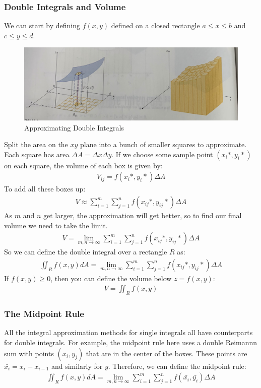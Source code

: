 \documentclass{article}
\begin{document}
\subsubsection{Double Integrals and Volume}
We can start by defining $f(x,y)$ defined on a closed rectangle $a \leqslant x \leqslant b$ and $c \leqslant y \leqslant d$.
\begin{figure}[H]
\begin{center}
\includegraphics[scale=0.15]{doubleint.jpg}
\caption{Approximating Double Integrals}
\label{doubleint}
\end{center}
\end{figure}
Split the area on the $xy$ plane into a bunch of smaller squares to approximate. Each square has area $\Delta A = \Delta x \Delta y$. If we choose some sample point $(x_i*,y_i*)$ on each square, the volume of each box is given by:
\begin{gather*}
    V_{ij} = f(x_i*,y_i*) \Delta A
\end{gather*}
To add all these boxes up:
\begin{gather*}
    V \approx \sum_{i = 1}^m\sum_{j = 1}^n f(x_{ij}*,y_{ij}*) \Delta A
\end{gather*}
As $m$ and $n$ get larger, the approximation will get better, so to find our final volume we need to take the limit.
\begin{gather*}
    V = \lim_{m,n \to \infty}\sum_{i = 1}^m\sum_{j = 1}^n f(x_{ij}*,y_{ij}*) \Delta A
\end{gather*}
So we can define the double integral over a rectangle $R$ as:
\begin{gather*}
    \iint_R f(x,y) dA = \lim_{m,n \to \infty}\sum_{i = 1}^m\sum_{j = 1}^n f(x_{ij}*,y_{ij}*) \Delta A
\end{gather*}
If $f(x,y) \geqslant 0$, then you can define the volume below $z = f(x,y)$:
\begin{gather*}
    V = \iint_R f(x,y)
\end{gather*}
\subsubsection{The Midpoint Rule}
All the integral approximation methods for single integrals all have counterparts for double integrals. For example, the midpoint rule here uses a double Reimannn sum with points $(x_i,y_j)$ that are in the center of the boxes. These points are $\bar{x_i} = x_i - x_{i-1}$ and similarly for $y$.
Therefore, we can define the midpoint rule:
\begin{gather*}
    \iint_R f(x,y) dA = \lim_{m,n \to \infty}\sum_{i = 1}^m\sum_{j = 1}^n f(\bar{x_{i}},\bar{y_{i}}) \Delta A
\end{gather*}
\end{document}
